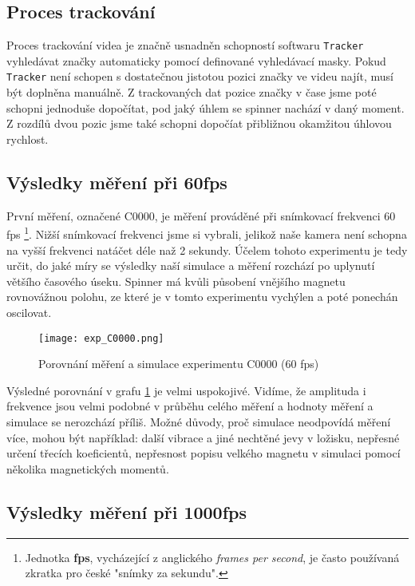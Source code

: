 \subsection{Proces trackování}

Proces trackování videa je značně usnadněn schopností softwaru \texttt{Tracker} vyhledávat značky automaticky pomocí definované vyhledávací masky. Pokud \texttt{Tracker} není schopen s dostatečnou jistotou pozici značky ve videu najít, musí být doplněna manuálně. Z trackovaných dat pozice značky v čase jsme poté schopni jednoduše dopočítat, pod jaký úhlem se spinner nachází v daný moment. Z rozdílů dvou pozic jsme také schopni dopočíat přibližnou okamžitou úhlovou rychlost.

\subsection{Výsledky měření při 60fps}

První měření, označené C0000, je měření prováděné při snímkovací frekvenci 60 fps \footnote{Jednotka \textbf{fps}, vycházející z anglického \textit{frames per second}, je často používaná zkratka pro české "snímky za sekundu".}.
Nižší snímkovací frekvenci jsme si vybrali, jelikož naše kamera není schopna na vyšší frekvenci natáčet déle naž 2 sekundy. Účelem tohoto experimentu je tedy určit, do jaké míry se výsledky naší simulace a měření rozchází po uplynutí většího časového úseku. Spinner má kvůli působení vnějšího magnetu rovnovážnou polohu, ze které je v tomto experimentu vychýlen a poté ponechán oscilovat.

\begin{figure}[!ht]
    \texttt{[image: exp\_C0000.png]}
    \centering
    \caption{Porovnání měření a simulace experimentu C0000 (60 fps)}
    \label{fig:exp_C0000}
\end{figure}

Výsledné porovnání v grafu \ref{fig:exp_C0000} je velmi uspokojivé. Vidíme, že amplituda i frekvence jsou velmi podobné v průběhu celého měření a hodnoty měření a simulace se nerozchází příliš. Možné důvody, proč simulace neodpovídá měření více, mohou být například: další vibrace a jiné nechtěné jevy v ložisku, nepřesné určení třecích koeficientů, nepřesnost popisu velkého magnetu v simulaci pomocí několika magnetických momentů.

\clearpage

\subsection{Výsledky měření při 1000fps}

